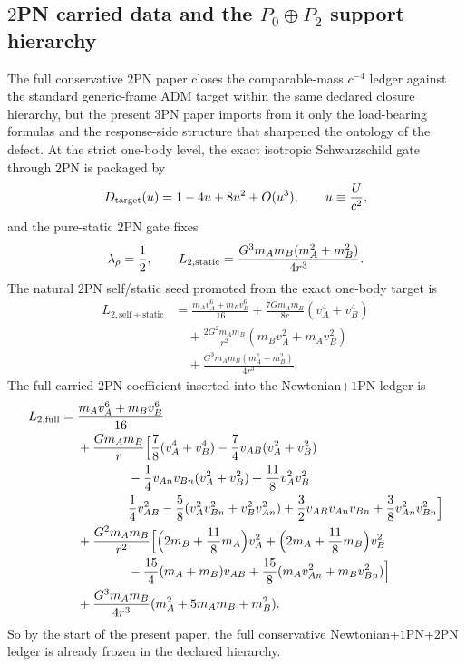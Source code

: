 \documentclass[11pt]{article}
\begin{document}
\subsection{\texorpdfstring{$2$}{2}PN carried data and the \texorpdfstring{$P_0\oplus P_2$}{P 0 + P 2} support hierarchy}
\label{app:carry-forward-2pn}

The full conservative $2$PN paper closes the comparable-mass $c^{-4}$ ledger
 against the standard generic-frame ADM target within the same declared closure
 hierarchy, but the present $3$PN paper imports from it only the load-bearing
 formulas and the response-side structure that sharpened the ontology of the
 defect.  At the strict one-body level, the exact isotropic Schwarzschild gate
 through $2$PN is packaged by
\[
D_{\rm target}(u)=1-4u+8u^2+O(u^3),
\qquad
u\equiv\frac{U}{c^2},
\]
and the pure-static $2$PN gate fixes
\[
\lambda_\rho=\frac12,
\qquad
L_{2,\rm static}=\frac{G^3m_A m_B(m_A^2+m_B^2)}{4r^3}.
\]
The natural $2$PN self/static seed promoted from the exact one-body target is
\[
\begin{aligned}
L_{2,\mathrm{self+static}}
&= \frac{m_Av_A^6+m_Bv_B^6}{16}
 + \frac{7Gm_A m_B}{8r}(v_A^4+v_B^4)
\\
&\quad + \frac{2G^2m_A m_B}{r^2}(m_Bv_A^2+m_Av_B^2)
\\
&\quad + \frac{G^3m_A m_B(m_A^2+m_B^2)}{4r^3}.
\end{aligned}
\]
The full carried $2$PN coefficient inserted into the Newtonian+$1$PN ledger is
\[
\begin{aligned}
L_{2,\rm full}
={}&\frac{m_Av_A^6+m_Bv_B^6}{16}
\\
&+\frac{Gm_A m_B}{r}
\Big[
\frac78(v_A^4+v_B^4)
-\frac74 v_{AB}(v_A^2+v_B^2)
\\
&\hspace{4em}
\hspace{0pt}-\frac14 v_{An}v_{Bn}(v_A^2+v_B^2)
+\frac{11}{8}v_A^2v_B^2
\\
&\hspace{4em}
\frac14 v_{AB}^2
-\frac58(v_A^2v_{Bn}^2+v_B^2v_{An}^2)
+\frac32 v_{AB}v_{An}v_{Bn}
+\frac38 v_{An}^2v_{Bn}^2
\Big]
\\
&+\frac{G^2m_A m_B}{r^2}
\Big[
\Big(2m_B+\frac{11}{8}m_A\Big)v_A^2
+\Big(2m_A+\frac{11}{8}m_B\Big)v_B^2
\\
&\hspace{4em}
-\frac{15}{4}(m_A+m_B)v_{AB}
+\frac{15}{8}(m_Av_{An}^2+m_Bv_{Bn}^2)
\Big]
\\
&+\frac{G^3m_A m_B}{4r^3}(m_A^2+5m_A m_B+m_B^2).
\end{aligned}
\]
So by the start of the present paper, the full conservative Newtonian+$1$PN+$2$PN
 ledger is already frozen in the declared hierarchy.
\end{document}
